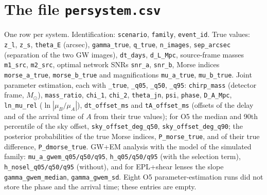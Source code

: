 \documentclass[aps,prd,onecolumn,nofootinbib,floatfix]{revtex4-2}
\begin{document}
\section{The file \texttt{persystem.csv}}
\label{sec:csv}
One row per system. Identification: \texttt{scenario}, \texttt{family}, \texttt{event\_id}. True values: \texttt{z\_l}, \texttt{z\_s}, \texttt{theta\_E} (arcsec), \texttt{gamma\_true}, \texttt{q\_true}, \texttt{n\_images}, \texttt{sep\_arcsec} (separation of the two GW images), \texttt{dt\_days}, \texttt{d\_L\_Mpc}, source-frame masses \texttt{m1\_src}, \texttt{m2\_src}, optimal network SNRs \texttt{snr\_a}, \texttt{snr\_b}, Morse indices \texttt{morse\_a\_true}, \texttt{morse\_b\_true} and magnifications \texttt{mu\_a\_true}, \texttt{mu\_b\_true}. Joint parameter estimation, each with \texttt{\_true}, \texttt{\_q05}, \texttt{\_q50}, \texttt{\_q95}: \texttt{chirp\_mass} (detector frame, $M_\odot$), \texttt{mass\_ratio}, \texttt{chi\_1}, \texttt{chi\_2}, \texttt{theta\_jn}, \texttt{psi}, \texttt{phase}, \texttt{D\_A\_Mpc}, \texttt{ln\_mu\_rel} ($\ln|\mu_B/\mu_A|$), \texttt{dt\_offset\_ms} and \texttt{tA\_offset\_ms} (offsets of the delay and of the arrival time of $A$ from their true values); for O5 the median and 90th percentile of the sky offset, \texttt{sky\_offset\_deg\_q50}, \texttt{sky\_offset\_deg\_q90}; the posterior probabilities of the true Morse indices, \texttt{P\_morse\_true}, and of their true difference, \texttt{P\_dmorse\_true}. GW+EM analysis with the model of the simulated family: \texttt{mu\_a\_gwem\_q05/q50/q95}, \texttt{h\_q05/q50/q95} (with the selection term), \texttt{h\_nosel\_q05/q50/q95} (without), and for EPL+shear lenses the slope \texttt{gamma\_gwem\_median}, \texttt{gamma\_gwem\_sd}. Eight O5 parameter-estimation runs did not store the phase and the arrival time; these entries are empty.
\end{document}
